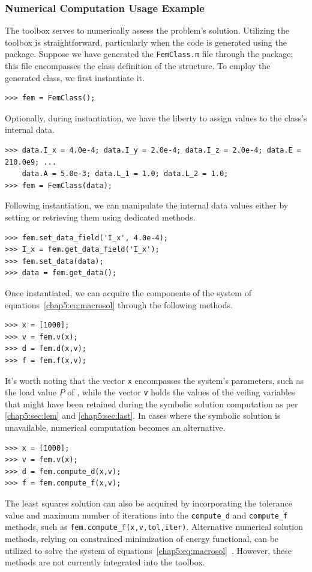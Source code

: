 \subsubsection*{\TrussMe{} Numerical Computation Usage Example}

The \TrussMe{} \Matlab{} toolbox serves to numerically assess the problem's solution. Utilizing the toolbox is straightforward, particularly when the code is generated using the \TrussMe{} \Maple{} package. Suppose we have generated the \texttt{FemClass.m} file through the \TrussMe{} \Maple{} package; this file encompasses the class definition of the structure. To employ the generated class, we first instantiate it.
%
\begin{verbatim}
>>> fem = FemClass();
\end{verbatim}
%
Optionally, during instantiation, we have the liberty to assign values to the class's internal data.
%
\begin{verbatim}
>>> data.I_x = 4.0e-4; data.I_y = 2.0e-4; data.I_z = 2.0e-4; data.E = 210.0e9; ...
    data.A = 5.0e-3; data.L_1 = 1.0; data.L_2 = 1.0;
>>> fem = FemClass(data);
\end{verbatim}
%
Following instantiation, we can manipulate the internal data values either by setting or retrieving them using dedicated methods.
%
\begin{verbatim}
>>> fem.set_data_field('I_x', 4.0e-4);
>>> I_x = fem.get_data_field('I_x');
>>> fem.set_data(data);
>>> data = fem.get_data();
\end{verbatim}
%
Once instantiated, we can acquire the components of the system of equations~\eqref{chap5:eq:macrosol} through the following methods.
%
\begin{verbatim}
>>> x = [1000];
>>> v = fem.v(x);
>>> d = fem.d(x,v);
>>> f = fem.f(x,v);
\end{verbatim}
%
It's worth noting that the vector \texttt{x} encompasses the system's parameters, such as the load value $P$ of , while the vector \texttt{v} holds the values of the veiling variables that might have been retained during the symbolic solution computation as per \ref{chap5:sec:lem} and \ref{chap5:sec:last}. In cases where the symbolic solution is unavailable, numerical computation becomes an alternative.
%
\begin{verbatim}
>>> x = [1000];
>>> v = fem.v(x);
>>> d = fem.compute_d(x,v);
>>> f = fem.compute_f(x,v);
\end{verbatim}
%
The least squares solution can also be acquired by incorporating the tolerance value and maximum number of iterations into the \texttt{compute_d} and \texttt{compute_f} methods, such as \texttt{fem.compute_f(x,v,tol,iter)}. Alternative numerical solution methods, relying on constrained minimization of energy functional, can be utilized to solve the system of equations~\eqref{chap5:eq:macrosol}~\cite{hutton2004fundamentals}. However, these methods are not currently integrated into the \TrussMe{} \Matlab{} toolbox.

